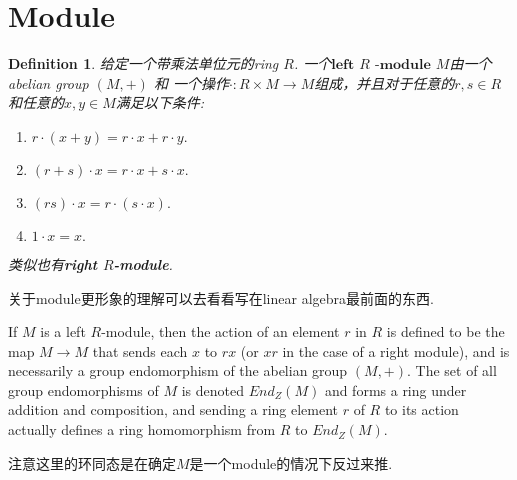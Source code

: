 \documentclass{article}
\newtheorem{definition}[theorem]{Definition}
\begin{document}
\section{Module}
\begin{definition}
\rm 给定一个带乘法单位元的ring $R$. 一个$\textbf{left}$ $R$ $\textbf{-module}$ $M$由一个abelian group $(M,+)$ 和 一个操作$\cdot \colon R \times M \rightarrow M$组成，并且对于任意的$r,s \in R$和任意的$x,y \in M$满足以下条件:

\begin{enumerate}
	\item $r \cdot (x+y) = r \cdot x + r \cdot y.$ 
	\item $(r+s) \cdot x = r \cdot x + s \cdot x.$
	\item $(rs) \cdot x = r \cdot (s \cdot x).$
	\item $1 \cdot x  = x.$
\end{enumerate}
类似也有\textbf{right $R$-module}.
\end{definition}

{ \color{red} 关于module更形象的理解可以去看看写在linear algebra最前面的东西}.

{ \color{blue} If $M$ is a left $R$-module, then the action of an element $r$ in $R$ is defined to be the map $M \rightarrow M$ that sends each $x$ to $rx$ (or $xr$ in the case of a right module), and is necessarily a group endomorphism of the abelian group $(M, +)$. The set of all group endomorphisms of $M$ is denoted $End_Z(M)$ and forms a ring under addition and composition, and sending a ring element $r$ of $R$ to its action actually defines a ring homomorphism from $R$ to $End_Z(M)$}.

注意这里的环同态是在确定$M$是一个module的情况下反过来推.
\end{document}
